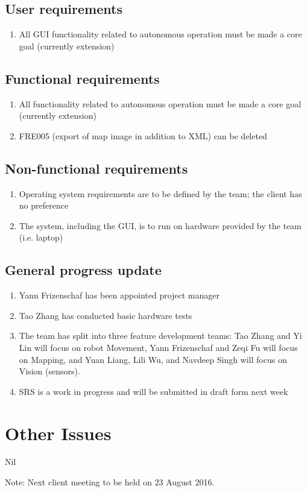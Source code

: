 \documentclass[11pt, a4paper]{article}
\begin{document}
\subsection{User requirements}

\begin{enumerate}
\item All GUI functionality related to autonomous operation must be made a core goal (currently extension)
\end{enumerate}

\subsection{Functional requirements}

\begin{enumerate}
\item All functionality related to autonomous operation must be made a core goal (currently extension)
\item FRE005 (export of map image in addition to XML) can be deleted
\end{enumerate}


\subsection{Non-functional requirements}

\begin{enumerate}
\item Operating system requirements are to be defined by the team; the client has no preference
\item The system, including the GUI, is to run on hardware provided by the team (i.e. laptop)
\end{enumerate}

\subsection{General progress update}
\begin{enumerate}
\item Yann Frizenschaf has been appointed project manager
\item Tao Zhang has conducted basic hardware tests
\item The team has split into three feature development teams: Tao Zhang and Yi Lin will focus on robot Movement, Yann Frizenschaf and Zeqi  Fu will focus on Mapping, and Yuan Liang, Lili Wu, and Navdeep Singh will focus on Vision (sensors).
\item SRS is a work in progress and will be submitted in draft form next week
\end{enumerate}


 
\section{Other Issues}

Nil

\vspace*{10pt}
\noindent Note: Next client meeting to be held on 23 August 2016.
\end{document}
